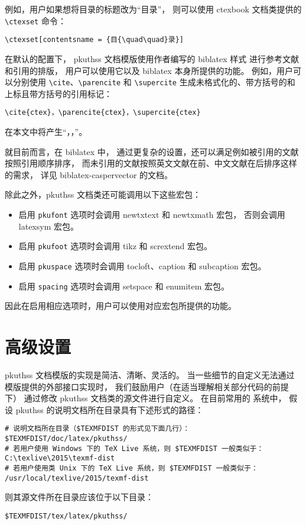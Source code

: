 例如，用户如果想将目录的标题改为“目{\quad\quad}录”，
则可以使用 ctexbook 文档类提供的 \verb|\ctexset| 命令：
\begin{Verbatim}[frame = single]
\ctexset[contentsname = {目{\quad\quad}录}]
\end{Verbatim}

在默认的配置下，%
pkuthss 文档模版使用作者编写的 biblatex\supercite{biblatex} 样式%
\mbox{\supercite{biblatex-caspervector}}进行参考文献和引用的排版，
用户可以使用它以及 biblatex 本身所提供的功能。
例如，用户可以分别使用 \verb|\cite|、\verb|\parencite| 和 \verb|\supercite|
生成未格式化的、带方括号的和上标且带方括号的引用标记：
\begin{Verbatim}[frame = single]
\cite{ctex}，\parencite{ctex}，\supercite{ctex}
\end{Verbatim}
在本文中将产生“\cite{ctex}，\parencite{ctex}，\supercite{ctex}”。

就目前而言，在 biblatex 中，
通过更复杂的设置，还可以满足例如被引用的文献按照引用顺序排序，
而未引用的文献按照英文文献在前、中文文献在后排序这样的需求，
详见 biblatex-caspervector 的文档\supercite{biblatex-caspervector}。

除此之外，pkuthss 文档类还可能调用以下这些宏包：
\begin{itemize}
	\item 启用 \verb|pkufont| 选项时会调用
		newtxtext 和 newtxmath\supercite{newtx} 宏包，
		否则会调用 latexsym\supercite{latexsym} 宏包。
	\item 启用 \verb|pkufoot| 选项时会调用
		tikz\supercite{tikz} 和 scrextend\supercite{scrextend} 宏包。
	\item 启用 \verb|pkuspace| 选项时会调用
		tocloft\supercite{tocloft}、caption\supercite{caption} 和
		subcaption\supercite{subcaption} 宏包。
	\item 启用 \verb|spacing| 选项时会调用 setspace 和
		enumitem\supercite{enumitem} 宏包。
\end{itemize}
因此在启用相应选项时，用户可以使用对应宏包所提供的功能。

\section{高级设置}\label{sec:advanced}

pkuthss 文档模版的实现是简洁、清晰、灵活的。
当一些细节的自定义无法通过模版提供的外部接口实现时，
我们鼓励用户（在适当理解相关部分代码的前提下）
通过修改 pkuthss 文档类的源文件进行自定义。
在目前常用的  系统中，
假设 pkuthss 的说明文档所在目录具有下述形式的路径：
\begin{Verbatim}[frame = single]
# 说明文档所在目录（$TEXMFDIST 的形式见下面几行）：
$TEXMFDIST/doc/latex/pkuthss/
# 若用户使用 Windows 下的 TeX Live 系统，则 $TEXMFDIST 一般类似于：
C:\texlive\2015\texmf-dist
# 若用户使用类 Unix 下的 TeX Live 系统，则 $TEXMFDIST 一般类似于：
/usr/local/texlive/2015/texmf-dist
\end{Verbatim}
则其源文件所在目录应该位于以下目录：
\begin{Verbatim}[frame = single]
$TEXMFDIST/tex/latex/pkuthss/
\end{Verbatim}

